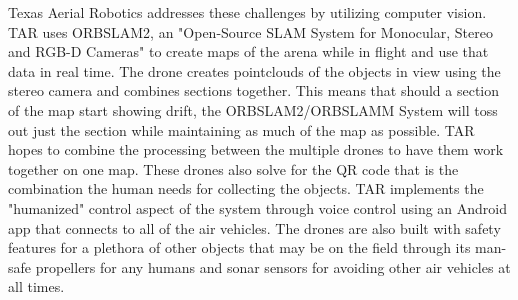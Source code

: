 \documentclass[12pt,letterpaper]{article}
\begin{document}
	Texas Aerial Robotics addresses these challenges by utilizing computer vision. TAR uses ORBSLAM2, an "Open-Source SLAM System for Monocular, Stereo and RGB-D Cameras" to create maps of the arena while in flight and use that data in real time. The drone creates pointclouds of the objects in view using the stereo camera and combines sections together. This means that should a section of the map start showing drift, the ORBSLAM2/ORBSLAMM System will toss out just the section while maintaining as much of the map as possible. TAR hopes to combine the processing between the multiple drones to have them work together on one map. These drones also solve for the QR code that is the combination the human needs for collecting the objects. TAR implements the "humanized" control aspect of the system through voice control using an Android app that connects to all of the air vehicles. The drones are also built with safety features for a plethora of other objects that may be on the field through its man-safe propellers for any humans and sonar sensors for avoiding other air vehicles at all times.
\end{document}
